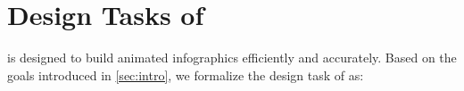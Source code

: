 \section{Design Tasks of \gaia{}}







\gaia{} is designed to build animated infographics efficiently and accurately.
Based on the goals introduced in \autoref{sec:intro}, we formalize the design task of \gaia{} as:

